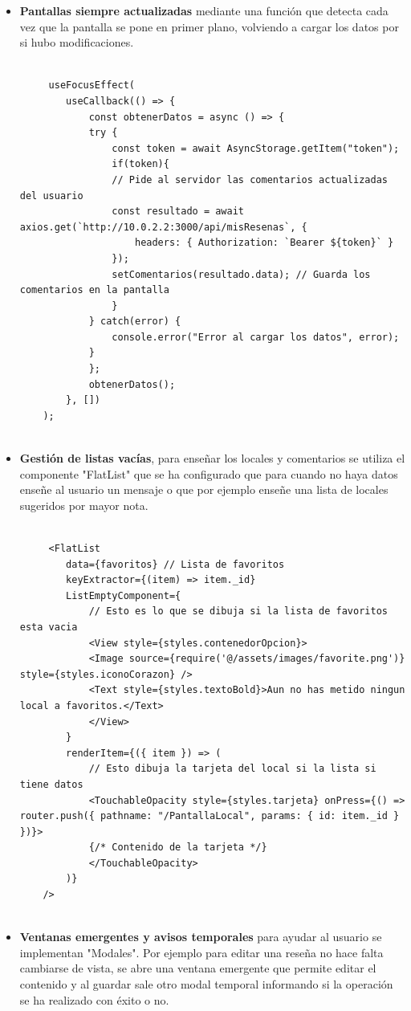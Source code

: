 \documentclass[a4paper,11pt]{article}
\begin{document}
\begin{itemize}
    \item \textbf{Pantallas siempre actualizadas} mediante una función que detecta cada vez que la pantalla se pone en primer plano, volviendo a cargar los datos por si hubo modificaciones.
    \vspace{0.2cm}
    \begin{lstlisting}[style=javascript, caption={Ejemplo de recarga de datos en la vista Reseñas.}]

     useFocusEffect(
        useCallback(() => {
            const obtenerDatos = async () => {
            try {
                const token = await AsyncStorage.getItem("token");
                if(token){
                // Pide al servidor las comentarios actualizadas del usuario
                const resultado = await axios.get(`http://10.0.2.2:3000/api/misResenas`, {
                    headers: { Authorization: `Bearer ${token}` }
                });
                setComentarios(resultado.data); // Guarda los comentarios en la pantalla
                }
            } catch(error) {
                console.error("Error al cargar los datos", error);
            }
            };
            obtenerDatos();
        }, [])
    );   
        
    \end{lstlisting}
    \item \textbf{Gestión de listas vacías}, para enseñar los locales y comentarios se utiliza el componente "FlatList" que se ha configurado que para cuando no haya datos enseñe al usuario un mensaje o que por ejemplo enseñe una lista de locales sugeridos por mayor nota.
    \vspace{0.2cm}
    \begin{lstlisting}[style=javascript, caption={Ejemplo de recarga de datos en la vista Reseñas.}]

     <FlatList
        data={favoritos} // Lista de favoritos
        keyExtractor={(item) => item._id}
        ListEmptyComponent={
            // Esto es lo que se dibuja si la lista de favoritos esta vacia
            <View style={styles.contenedorOpcion}>
            <Image source={require('@/assets/images/favorite.png')} style={styles.iconoCorazon} />
            <Text style={styles.textoBold}>Aun no has metido ningun local a favoritos.</Text>
            </View>
        }
        renderItem={({ item }) => (
            // Esto dibuja la tarjeta del local si la lista si tiene datos
            <TouchableOpacity style={styles.tarjeta} onPress={() => router.push({ pathname: "/PantallaLocal", params: { id: item._id } })}>
            {/* Contenido de la tarjeta */}
            </TouchableOpacity>
        )}
    />
        
    \end{lstlisting}
    \item \textbf{Ventanas emergentes y avisos temporales} para ayudar al usuario se implementan "Modales". Por ejemplo para editar una reseña no hace falta cambiarse de vista, se abre una ventana emergente que permite editar el contenido y al guardar sale otro modal temporal informando si la operación se ha realizado con éxito o no.
\end{itemize}
\end{document}

